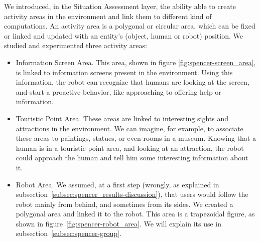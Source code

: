 We introduced, in the Situation Assessment layer, the ability able to create activity areas in the environment and link them to different kind of computations. An activity area is a polygonal or circular area, which can be fixed or linked and updated with an entity's (object, human or robot) position. We studied and experimented three activity areas:

\begin{itemize}
\item Information Screen Area. This area, shown in figure \ref{fig:spencer-screen_area}, is linked to information screens present in the environment. Using this information, the robot can recognize that humans are looking at the screen, and  start a proactive behavior, like approaching to offering help or information.
\item Touristic Point Area. These areas are linked to interesting sights and attractions in the environment. We can imagine, for example, to associate these areas to paintings, statues, or even rooms in a museum. Knowing that a human is in a touristic point area, and looking at an attraction, the robot could approach the human and tell him some interesting information about it.
\item Robot Area. We assumed, at a first step (wrongly, as explained in subsection~\ref{subsec:spencer_results-discussion}), that users would follow the robot mainly from behind, and sometimes from its sides. We created a polygonal area and linked it to the robot. This area is a trapezoidal figure, as shown in figure~\ref{fig:spencer-robot_area}. We will explain its use in subsection~\ref{subsec:spencer-group}.
\end{itemize}


